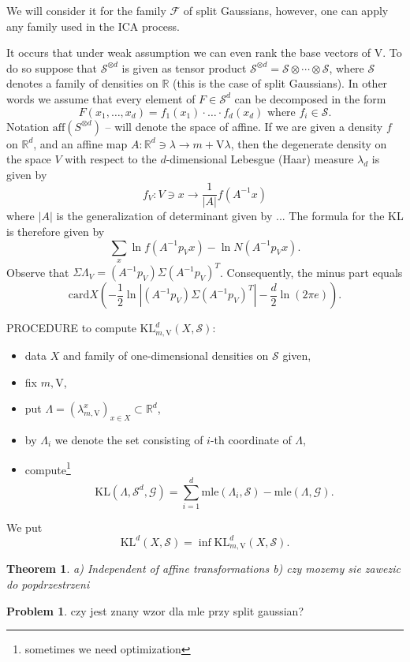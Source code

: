 \documentclass[12pt]{article}
\def\R{\mathbb{R}}
\def\v{\mathrm{V}}
\def\F{\mathcal{F}}
\def\G{\mathcal{G}}
\def\S{\mathcal{S}}
\def\KL{\mathrm{KL}}
\def\mle{\mathrm{mle}}
\def\card{\mathrm{card}}
\def\aff{\mathrm{aff}}
\newtheorem{theorem}{Theorem}[section]
\theoremstyle{definition}
\newtheorem{problem}{Problem}[section]
\begin{document}
We will consider it for the family $\F$ of split Gaussians, however, one can apply any family used in the ICA process.
 
	 It occurs that under weak assumption we can even rank the base vectors of $\v$. To do so suppose that $\S^{\otimes d}$ is given as tensor product 
$\S^{\otimes d}=\S \otimes \cdots \otimes \S$, where $\S$ denotes a family of densities on $\R$
(this is the case of split Gaussians). 
In other words we assume that every element of $F \in \S^d$ can be decomposed in the form 
$$
F(x_1,\ldots,x_d)=f_1(x_1) \cdot \ldots \cdot f_d(x_d)\text{ where }f_i \in \S.
$$
Notation $\aff(S^{\otimes d})$ -- will denote the space of affine. If we are given
a density $f$ on $\R^d$, and an affine map $A:\R^d \ni \lambda \to m+\v \lambda$, then
the degenerate density on the space $V$ with respect to the $d$-dimensional Lebesgue (Haar) measure  $\lambda_d$ is given by
$$
f_V:V \ni x \to \frac{1}{|A|}f(A^{-1}x)
$$
where $|A|$ is the generalization of determinant given by ... 
The formula for the KL is therefore given by
$$
\sum_x \ln f(A^{-1}p_Vx) -\ln N(A^{-1}p_Vx).
$$
Observe that $\Sigma \Lambda_V=(A^{-1}p_V)\Sigma(A^{-1}p_V)^T$.
Consequently, the minus part equals
$$
\card X(-\frac{1}{2}\ln |(A^{-1}p_V)\Sigma(A^{-1}p_V)^T|-\frac{d}{2}\ln(2\pi e)).
$$

PROCEDURE to compute $\KL^d_{m,\v}(X,\S)$:
\begin{itemize}
\item data $X$ and family of one-dimensional densities on $\S$ given,
\item fix $m,\v$,
\item put $\Lambda=(\lambda_{m,\v}^x)_{x \in X} \subset \R^d$,
\item by $\Lambda_i$ we denote the set consisting of $i$-th coordinate of $\Lambda$,
\item compute\footnote{sometimes we need optimization}
$$
\KL(\Lambda,\S^d,\G)=\sum_{i=1}^d \mle(\Lambda_i,\S)-\mle(\Lambda,\G).
$$
\end{itemize}

We put
$$
\KL^d(X,\S)=\inf \KL^d_{m,\v}(X,\S).
$$

\begin{theorem}
a) Independent of affine transformations b) czy mozemy sie zawezic do popdrzestrzeni
\end{theorem}

\begin{problem}
czy jest znany wzor dla mle przy split gaussian?
\end{problem}
\end{document}
